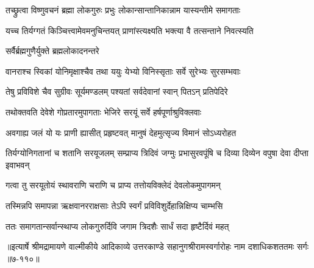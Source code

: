 \twolineshloka
{तच्छ्रुत्वा विष्णुवचनं ब्रह्मा लोकगुरुः प्रभुः}
{लोकान्सान्तानिकान्नाम यास्यन्तीमे समागताः} %

\twolineshloka
{यच्च तिर्यग्गतं किञ्चित्त्वामेवमनुचिन्तयत्}
{प्राणांस्त्यक्ष्यति भक्त्या वै तत्सन्ताने निवत्स्यति} %

\onelineshloka
{सर्वैर्ब्रह्मगुणैर्युक्ते ब्रह्मलोकादनन्तरे} %

\twolineshloka
{वानराश्च स्विकां योनिमृक्षाश्चैव तथा ययुः}
{येभ्यो विनिस्सृताः सर्वे सुरेभ्यः सुरसम्भवाः} %

\twolineshloka
{तेषु प्रविविशे चैव सुग्रीवः सूर्यमण्डलम्}
{पश्यतां सर्वदेवानां स्वान् पितऽन् प्रतिपेदिरे} %

\twolineshloka
{तथोक्तवति देवेशे गोप्रतारमुपागताः}
{भेजिरे सरयूं सर्वे हर्षपूर्णाश्रुविक्लवाः} %

\twolineshloka
{अवगाह्य जलं यो यः प्राणी ह्यासीत् प्रहृष्टवत्}
{मानुषं देहमुत्सृज्य विमानं सोऽध्यरोहत} %

\threelineshloka
{तिर्यग्योनिगतानां च शतानि सरयूजलम्}
{सम्प्राप्य त्रिदिवं जग्मुः प्रभासुरवपूंषि च}
{दिव्या दिव्येन वपुषा देवा दीप्ता इवाभवन्} %

\twolineshloka
{गत्वा तु सरयूतोयं स्थावराणि चराणि च}
{प्राप्य तत्तोयविक्लेदं देवलोकमुपागमन्} %

\twolineshloka
{तस्मिन्नपि समापन्ना ऋक्षवानरराक्षसाः}
{तेऽपि स्वर्गं प्रविविशुर्देहान्निक्षिप्य चाम्भसि} %

\twolineshloka
{ततः समागतान्सर्वान्स्थाप्य लोकगुरुर्दिवि}
{जगाम त्रिदशैः सार्धं सदा हृष्टैर्दिवं महत्} %


॥इत्यार्षे श्रीमद्रामायणे वाल्मीकीये आदिकाव्ये उत्तरकाण्डे सहानुगश्रीरामस्वर्गारोहः नाम दशाधिकशततमः सर्गः ॥७-११०॥
